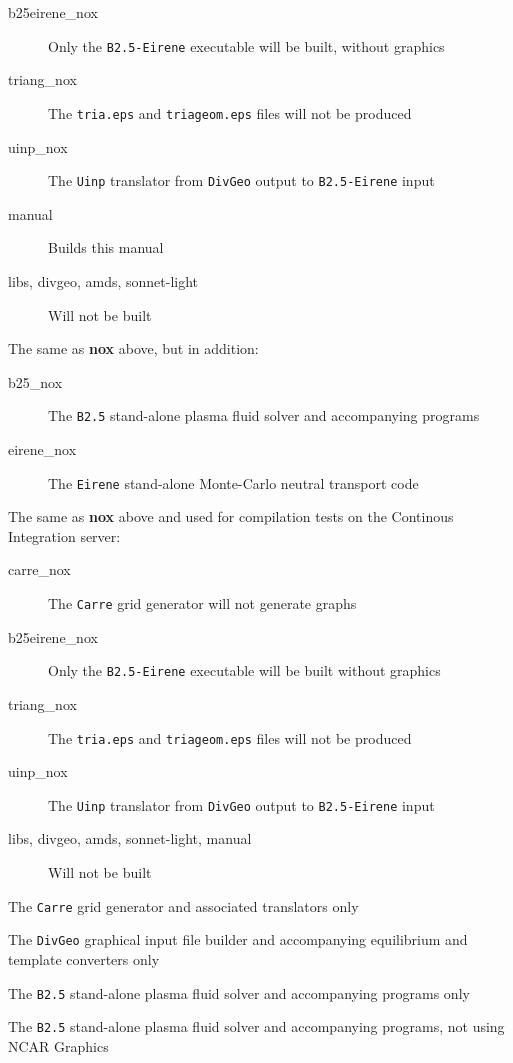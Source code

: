 \documentclass[a4paper,10pt]{report}
\begin{document}
\begin{description}
\begin{description}
      \item[b25eirene\_nox] Only the {\tt B2.5-Eirene} executable will be built, without graphics
      \item[triang\_nox] The {\tt tria.eps} and {\tt triageom.eps} files will not be produced
      \item[uinp\_nox] The {\tt Uinp} translator from {\tt DivGeo} output to {\tt B2.5-Eirene} input
      \item[manual] Builds this manual
      \item[libs, divgeo, amds, sonnet-light] Will not be built
    \end{description}
  \item[all\_nox] The same as {\bf nox} above, but in addition:
    \begin{description}
      \item[b25\_nox] The {\tt B2.5} stand-alone plasma fluid solver and accompanying programs
      \item[eirene\_nox] The {\tt Eirene} stand-alone Monte-Carlo neutral transport code
    \end{description}
  \item[nox\_build] The same as {\bf nox} above and used for compilation tests on the Continous Integration server:
    \begin{description}
      \item[carre\_nox] The {\tt Carre} grid generator will not generate graphs
      \item[b25eirene\_nox] Only the {\tt B2.5-Eirene} executable will be built without graphics
      \item[triang\_nox] The {\tt tria.eps} and {\tt triageom.eps} files will not be produced
      \item[uinp\_nox] The {\tt Uinp} translator from {\tt DivGeo} output to {\tt B2.5-Eirene} input
      \item[libs, divgeo, amds, sonnet-light, manual] Will not be built
    \end{description}
  \item[carre] The {\tt Carre} grid generator and associated translators only
  \item[divgeo] The {\tt DivGeo} graphical input file builder and accompanying equilibrium and template converters only
  \item[b25] The {\tt B2.5} stand-alone plasma fluid solver and accompanying programs only
  \item[b25\_nox] The {\tt B2.5} stand-alone plasma fluid solver and accompanying programs, not using NCAR Graphics

\end{description}
\end{document}
